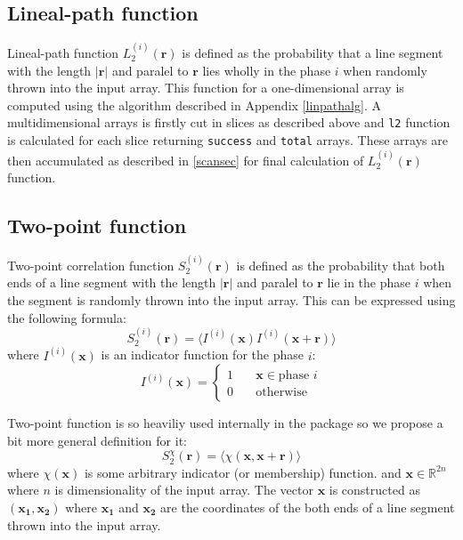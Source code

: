\documentclass[reprint,amsmath,amssymb,aps,pre]{revtex4-1}
\newcommand{\code}[1]{\colorbox{light-gray}{\texttt{#1}}}
\newcommand{\apref}[1]{Appendix \ref{#1}}
\begin{document}
\subsection{Lineal-path function}
Lineal-path function $L_2^{(i)}(\bm{r})$ is defined as the probability that a
line segment with the length $|\bm{r}|$ and paralel to $\bm{r}$ lies wholly in
the phase $i$ when randomly thrown into the input array. This function for a
one-dimensional array is computed using the algorithm described in
\apref{linpathalg}. A multidimensional arrays is firstly cut in slices as
described above and \code{l2} function is calculated for each slice returning
\code{success} and \code{total} arrays. These arrays are then accumulated as
described in \cref{scansec} for final calculation of $L_2^{(i)}(\bm{r})$
function.

\subsection{Two-point function}
Two-point correlation function $S_2^{(i)}(\bm{r})$ is defined as the probability
that both ends of a line segment with the length $|\bm{r}|$ and paralel to
$\bm{r}$ lie in the phase $i$ when the segment is randomly thrown into the input
array. This can be expressed using the following formula:
\begin{equation*}
  S_2^{(i)}(\bm{r}) = \langle I^{(i)}(\bm{x}) I^{(i)}(\bm{x} + \bm{r}) \rangle
\end{equation*}
where $I^{(i)}(\bm{x})$ is an indicator function for the phase $i$:
\begin{equation*}
I^{(i)}(\bm{x}) = \left\{
\begin{array}{ll}
  1 & \quad \bm{x} \in \text{phase $i$} \\
  0 & \quad \text{otherwise}
\end{array}
\right.
\end{equation*}

Two-point function is so heaviliy used internally in the package so we propose a
bit more general definition for it:
\begin{equation*}
  S_2^{\chi}(\bm{r}) = \langle \chi(\bm{x}, \bm{x} + \bm{r}) \rangle
\end{equation*}
where $\chi(\bm{x})$ is some arbitrary indicator (or membership) function. and
$\bm{x} \in \mathbb{R}^{2n}$ where $n$ is dimensionality of the input array. The
vector $\bm{x}$ is constructed as $(\bm{x_1}, \bm{x_2})$ where $\bm{x_1}$ and
$\bm{x_2}$ are the coordinates of the both ends of a line segment thrown into
the input array.
\end{document}
